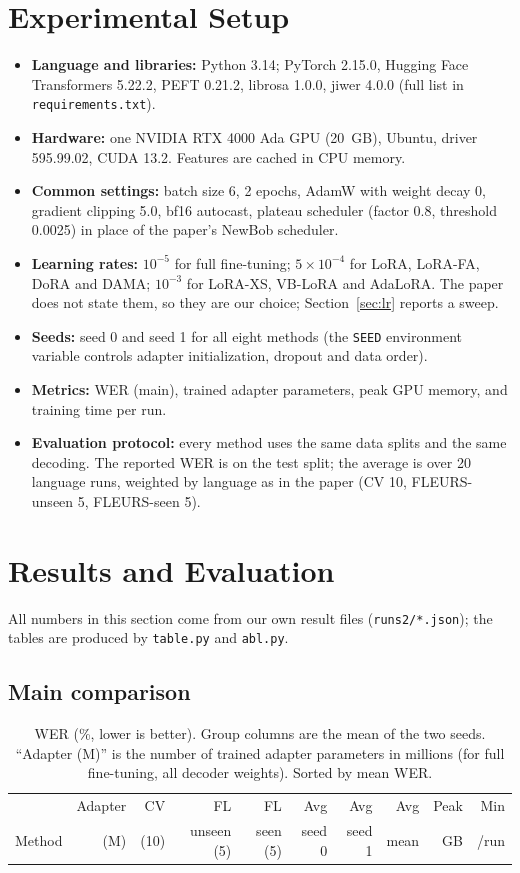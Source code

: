 \documentclass[11pt,a4paper]{article}
\begin{document}
\section{Experimental Setup}
\begin{itemize}
\item \textbf{Language and libraries:} Python 3.14; PyTorch 2.15.0, Hugging Face Transformers 5.22.2, PEFT 0.21.2, librosa 1.0.0, jiwer 4.0.0 (full list in \texttt{requirements.txt}).
\item \textbf{Hardware:} one NVIDIA RTX 4000 Ada GPU (20~GB), Ubuntu, driver 595.99.02, CUDA 13.2. Features are cached in CPU memory.
\item \textbf{Common settings:} batch size 6, 2 epochs, AdamW with weight decay 0, gradient clipping 5.0, bf16 autocast, plateau scheduler (factor 0.8, threshold 0.0025) in place of the paper's NewBob scheduler.
\item \textbf{Learning rates:} $10^{-5}$ for full fine-tuning; $5\times10^{-4}$ for LoRA, LoRA-FA, DoRA and DAMA; $10^{-3}$ for LoRA-XS, VB-LoRA and AdaLoRA. The paper does not state them, so they are our choice; Section~\ref{sec:lr} reports a sweep.
\item \textbf{Seeds:} seed 0 and seed 1 for all eight methods (the \texttt{SEED} environment variable controls adapter initialization, dropout and data order).
\item \textbf{Metrics:} WER (main), trained adapter parameters, peak GPU memory, and training time per run.
\item \textbf{Evaluation protocol:} every method uses the same data splits and the same decoding. The reported WER is on the test split; the average is over 20 language runs, weighted by language as in the paper (CV 10, FLEURS-unseen 5, FLEURS-seen 5).
\end{itemize}

\section{Results and Evaluation}
All numbers in this section come from our own result files (\texttt{runs2/*.json}); the tables are produced by \texttt{table.py} and \texttt{abl.py}.

\subsection{Main comparison}
\begin{table}[H]\centering\footnotesize\setlength{\tabcolsep}{4pt}
\begin{tabular}{lrrrrrrrrr}\toprule
 & Adapter & CV & FL & FL & Avg & Avg & Avg & Peak & Min\\
Method & (M) & (10) & unseen (5) & seen (5) & seed 0 & seed 1 & mean & GB & /run\\\midrule

\end{tabular}
\caption{WER (\%, lower is better). Group columns are the mean of the two seeds. ``Adapter (M)'' is the number of trained adapter parameters in millions (for full fine-tuning, all decoder weights). Sorted by mean WER.}\label{tab:main}
\end{table}
\end{document}
